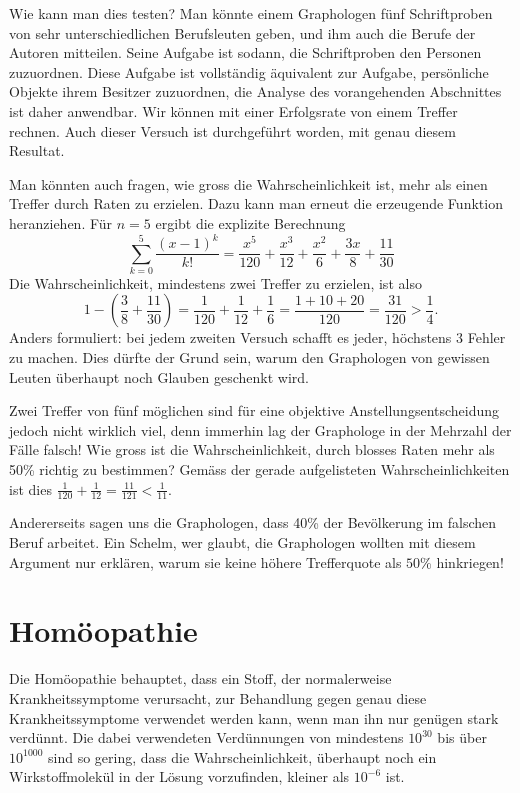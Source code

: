 Wie kann man dies testen? Man könnte einem Graphologen fünf Schriftproben
von sehr unterschiedlichen Berufsleuten geben, und ihm auch die Berufe
der Autoren mitteilen.
Seine Aufgabe ist sodann, die Schriftproben den
Personen zuzuordnen.
Diese Aufgabe ist vollständig äquivalent zur Aufgabe,
persönliche Objekte ihrem Besitzer zuzuordnen, die Analyse des vorangehenden
Abschnittes ist daher anwendbar.
Wir können mit einer Erfolgsrate von einem
Treffer rechnen.
Auch dieser Versuch ist durchgeführt worden, mit genau
diesem Resultat.

Man könnten auch fragen, wie gross die Wahrscheinlichkeit ist, mehr als einen
Treffer durch Raten zu erzielen.
Dazu kann man erneut die erzeugende Funktion
heranziehen.
Für $n=5$ ergibt die explizite Berechnung
$$\sum_{k=0}^5\frac{(x-1)^k}{k!}
=\frac{x^5}{120}+\frac{x^3}{12}+\frac{x^2}{6}+\frac{3 x}{8}+\frac{11}{30}
$$
Die Wahrscheinlichkeit, mindestens zwei Treffer zu erzielen, ist also
$$1-\left(\frac38+\frac{11}{30}\right)=\frac1{120}+\frac1{12}+\frac16=\frac{1+10+20}{120}=\frac{31}{120}>\frac14.$$
Anders formuliert: bei jedem zweiten Versuch schafft es jeder, höchstens $3$
Fehler zu machen.
Dies dürfte der Grund sein, warum den Graphologen
von gewissen Leuten überhaupt noch Glauben geschenkt wird.

Zwei Treffer von fünf möglichen sind für eine objektive Anstellungsentscheidung
jedoch nicht wirklich viel, denn immerhin lag der Graphologe in der Mehrzahl
der Fälle falsch! Wie gross ist die Wahrscheinlichkeit, durch blosses Raten
mehr als 50\% richtig zu bestimmen? Gemäss der gerade
aufgelisteten Wahrscheinlichkeiten ist dies
$\frac1{120}+\frac1{12}=\frac{11}{121}<\frac1{11}$.

Andererseits sagen uns die Graphologen, dass 40\% der Bevölkerung im falschen
Beruf arbeitet.
Ein Schelm, wer glaubt,
die Graphologen wollten mit diesem
Argument nur erklären, warum sie keine höhere Trefferquote als $50\%$ hinkriegen!


\section{Homöopathie}
Die Homöopathie behauptet, dass ein Stoff, der normalerweise Krankheitssymptome
verursacht, zur Behandlung gegen genau diese Krankheitssymptome verwendet werden
kann, wenn man ihn nur genügen stark verdünnt.
Die dabei verwendeten
Verdünnungen von mindestens $10^{30}$ bis über $10^{1000}$ sind so gering,
dass die Wahrscheinlichkeit, überhaupt noch ein Wirkstoffmolekül in der
Lösung vorzufinden, kleiner als $10^{-6}$ ist.

